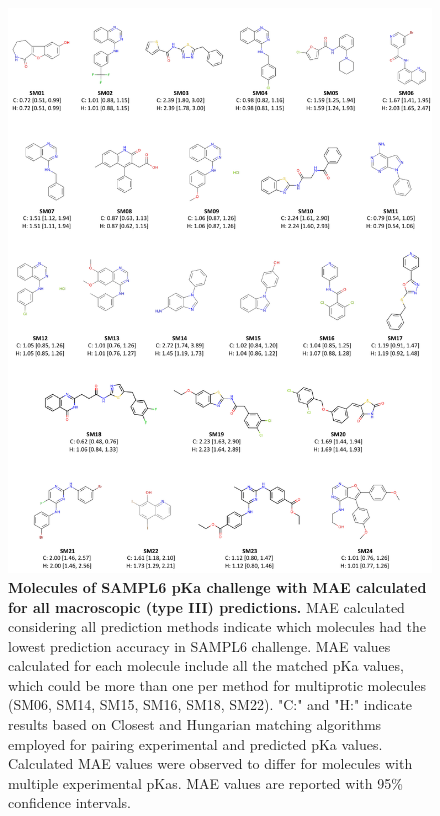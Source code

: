 \documentclass[9pt,lineno]{elife}
\begin{document}




\begin{figure}
\begin{center}
\includegraphics[width=1.00\linewidth]{figures/molecules_with_MAE_of_all_methods.pdf}
\caption{{\bf Molecules of SAMPL6 pKa challenge with MAE calculated for all macroscopic (type III) predictions.} MAE calculated considering all prediction methods indicate which molecules had the lowest prediction accuracy in SAMPL6 challenge. MAE values calculated for each molecule include all the matched pKa values, which could be more than one per method for multiprotic molecules (SM06, SM14, SM15, SM16, SM18, SM22). "C:" and "H:" indicate results based on Closest and Hungarian matching algorithms employed for pairing experimental and predicted pKa values. Calculated MAE values were observed to differ for molecules with multiple experimental pKas. MAE values are reported with 95\% confidence intervals.
}
\label{fig:molecules_with_MAE_of_all_methods}
\end{center}
\end{figure}
\end{document}
